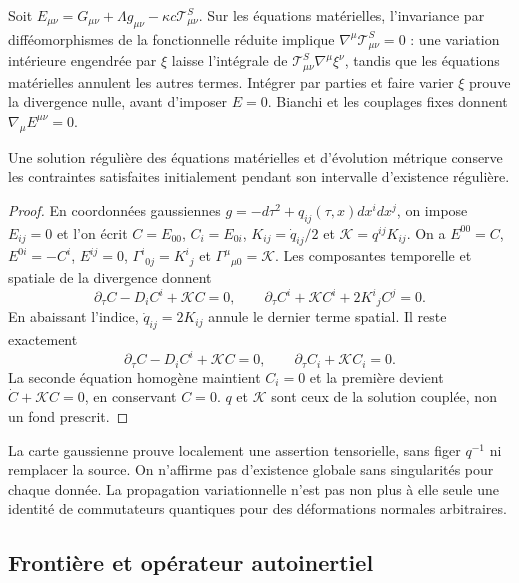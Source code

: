 Soit $E_{\mu\nu}=G_{\mu\nu}+\Lambda g_{\mu\nu}
-\kappa c\mathcal T^S_{\mu\nu}$. Sur les équations matérielles, l’invariance par difféomorphismes de la fonctionnelle réduite implique $\nabla^\mu\mathcal T^S_{\mu\nu}=0$ : une variation intérieure engendrée par $\xi$ laisse l’intégrale de $\mathcal T^S_{\mu\nu}\nabla^\mu\xi^\nu$, tandis que les équations matérielles annulent les autres termes. Intégrer par parties et faire varier $\xi$ prouve la divergence nulle, avant d’imposer $E=0$. Bianchi et les couplages fixes donnent $\nabla_\mu E^{\mu\nu}=0$.

\begin{proposition}
\label{hmtcuatro:gea:propagacion} Une solution régulière des équations matérielles et d’évolution métrique conserve les contraintes satisfaites initialement pendant son intervalle d’existence régulière.
\end{proposition}
\begin{proof}
En coordonnées gaussiennes $g=-d\tau^2+q_{ij}(\tau,x)dx^idx^j$, on impose $E_{ij}=0$ et l’on écrit $C=E_{00}$, $C_i=E_{0i}$, $K_{ij}=\dot q_{ij}/2$ et $\mathcal K=q^{ij}K_{ij}$. On a $E^{00}=C$, $E^{0i}=-C^i$, $E^{ij}=0$, $\Gamma^i{}_{0j}=K^i{}_j$ et $\Gamma^\mu{}_{\mu0}=\mathcal K$. Les composantes temporelle et spatiale de la divergence donnent
\[
\partial_\tau C-D_iC^i+\mathcal KC=0,\qquad
\partial_\tau C^i+\mathcal KC^i+2K^i{}_jC^j=0.
\]
En abaissant l’indice, $\dot q_{ij}=2K_{ij}$ annule le dernier terme spatial. Il reste exactement
\begin{equation}
\partial_\tau C-D_iC^i+\mathcal KC=0,\qquad
\partial_\tau C_i+\mathcal KC_i=0.
\label{hmtcuatro:gea:propagacion-sistema}
\end{equation}
La seconde équation homogène maintient $C_i=0$ et la première devient $\dot C+\mathcal KC=0$, en conservant $C=0$. $q$ et $\mathcal K$ sont ceux de la solution couplée, non un fond prescrit.
\end{proof}
La carte gaussienne prouve localement une assertion tensorielle, sans figer $q^{-1}$ ni remplacer la source. On n’affirme pas d’existence globale sans singularités pour chaque donnée. La propagation variationnelle n’est pas non plus à elle seule une identité de commutateurs quantiques pour des déformations normales arbitraires.

\subsection{Frontière et opérateur autoinertiel}
\label{hmtcuatro:gea:autoinercia}

